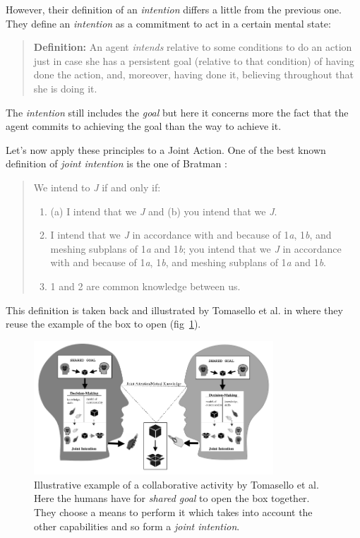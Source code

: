 \documentclass[english,a4paper,11pt,twoside]{StyleThese}
\begin{document}
However, their definition of an \textit{intention} differs a little from the previous one. They define an \textit{intention} as a commitment to act in a certain mental state:

\begin{quote}
\textbf{Definition:} An agent \textit{intends} relative to some conditions to do an action just in case she has a persistent goal (relative to that condition) of having done the action, and, moreover, having done it, believing throughout that she is doing it.
\end{quote}

The \textit{intention} still includes the \textit{goal} but here it concerns more the fact that the agent commits to achieving the goal than the way to achieve it.

Let's now apply these principles to a Joint Action. One of the best known definition of \textit{joint intention} is the one of Bratman \cite{bratman1993shared}:

\begin{quote}
We intend to \textit{J} if and only if:
\begin{enumerate}
\item (a) I intend that we \textit{J} and (b) you intend that we \textit{J}.
\item I intend that we \textit{J} in accordance with and because of 1\textit{a}, 1\textit{b}, and meshing subplans of 1\textit{a} and 1\textit{b}; you intend that we \textit{J} in accordance with and because of 1\textit{a}, 1\textit{b}, and meshing subplans of 1\textit{a} and 1\textit{b}.
\item 1 and 2 are common knowledge between us.
\end{enumerate}
\end{quote}

This definition is taken back and illustrated by Tomasello et al. in \cite{tomasello2005understanding} where they reuse the example of the box to open (fig~\ref{fig:intention_jointe}).
\begin{figure}[!h]
	\centering
    \includegraphics[width=0.8\textwidth]{figs/Chapter1/intention_jointe.png}
    \caption{Illustrative example of a collaborative activity by Tomasello et al. Here the humans have for \textit{shared goal} to open the box together. They choose a means to perform it which takes into account the other capabilities and so form a \textit{joint intention}.}
    \label{fig:intention_jointe}
\end{figure}
\end{document}
